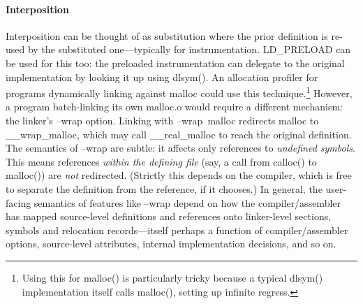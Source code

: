 \documentclass[preprint,10pt]{sigplanconf-pldi16}
\newcommand{\mynote}[2]{}
\newcommand{\sk}[1]{\mynote{SK}{#1}}
\newcommand{\ps}[1]{\mynote{PS}{#1}}
\begin{document}

\paragraph{Interposition}
Interposition can be thought of as substitution where the prior definition
is re-used by the substituted one---typically for instrumentation.
\textsf{LD\_PRELOAD} can be used for this too: the preloaded instrumentation can delegate to the original implementation by looking it up using \textsf{dlsym()}. 
An allocation profiler for programs dynamically linking against \textsf{malloc} could use this technique.\footnote{Using this for \textsf{malloc()} is particularly tricky because a typical \textsf{dlsym()} implementation itself calls \textsf{malloc()}, setting up infinite regress.}
However, a program batch-linking its own \textsf{malloc.o} would require a different mechanism: the linker's \textsf{--wrap} option. 
Linking with \textsf{--wrap~malloc} redirects \textsf{malloc} to \textsf{\_\_wrap\_malloc}, which may call \textsf{\_\_real\_malloc} to reach the original definition.
The semantics of \textsf{--wrap} are subtle: it affects only references to \emph{undefined symbols}.
This means references \emph{within the defining file} (say, a call from \textsf{calloc()} to \textsf{malloc()}) are \emph{not} redirected.
(Strictly this depends on the compiler, which is free to separate the definition
from the reference, if it chooses.)
In general, the user-facing semantics of features like \textsf{--wrap} depend on how the compiler/assembler has mapped source-level definitions and references onto linker-level sections, symbols and relocation records---itself perhaps a function of compiler/assembler options, source-level attributes, internal implementation decisions, and so on.
\end{document}
